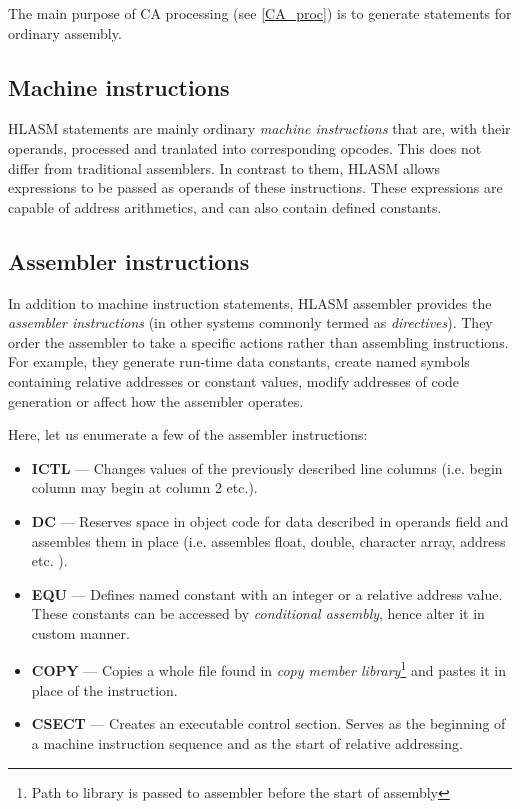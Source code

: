 The main purpose of CA processing (see \cref{CA_proc}) is to generate statements for ordinary assembly.

\subsection{Machine instructions}
\label{mach_instr}

HLASM statements are mainly ordinary \emph{machine instructions} that are, with their operands, processed and tranlated into corresponding opcodes. This does not differ from traditional assemblers. In contrast to them, HLASM allows expressions to be passed as operands of these instructions. These expressions are capable of address arithmetics, and can also contain defined constants.

\subsection{Assembler instructions}
\label{asm_instrs}

In addition to machine instruction statements, HLASM assembler provides the \emph{assembler instructions} (in other systems commonly termed as \emph{directives}). They order the assembler to take a specific actions rather than assembling instructions. For example, they generate run-time data constants, create named symbols containing relative addresses or constant values, modify addresses of code generation or affect how the assembler operates.

Here, let us enumerate a few of the assembler instructions:
\begin{itemize}
	\item \textbf{ICTL} --- Changes values of the previously described line columns (i.e. begin column may begin at column 2 etc.).
	
	\item \textbf{DC} --- Reserves space in object code for data described in operands field and assembles them in place (i.e. assembles float, double, character array, address etc. ).
	
	\item \textbf{EQU} --- Defines named constant with an integer or a relative address value. These constants can be accessed by \emph{conditional assembly}, hence alter it in custom manner.
	
	\item \textbf{COPY} --- Copies a whole file found in \emph{copy member library}\footnote{Path to library is passed to assembler before the start of assembly} and pastes it in place of the instruction.
	
	\item \textbf{CSECT} --- Creates an executable control section. Serves as the beginning of a machine instruction sequence and as the start of relative addressing.
\end{itemize}


